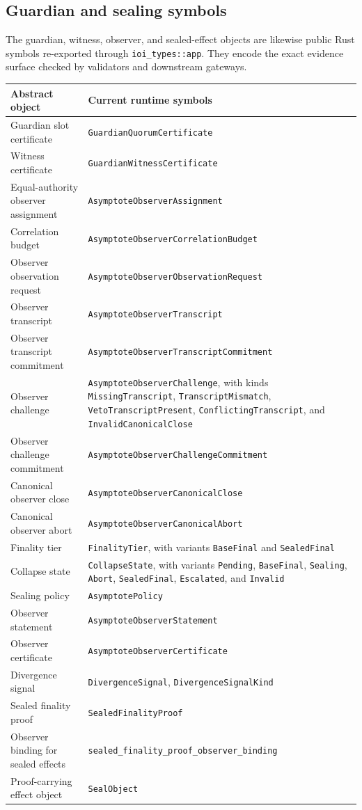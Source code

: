 \documentclass[11pt]{article}
\newcommand{\code}[1]{\texttt{#1}}
\begin{document}
\subsection{Guardian and sealing symbols}

The guardian, witness, observer, and sealed-effect objects are likewise public
Rust symbols re-exported through \code{ioi\_types::app}. They encode the exact
evidence surface checked by validators and downstream gateways.

\begin{center}
\small
\begin{tabularx}{\textwidth}{>{\raggedright\arraybackslash}p{} X}
\toprule
\textbf{Abstract object} & \textbf{Current runtime symbols} \\
\midrule
Guardian slot certificate & \code{GuardianQuorumCertificate} \\
Witness certificate & \code{GuardianWitnessCertificate} \\
Equal-authority observer assignment & \code{AsymptoteObserverAssignment} \\
Correlation budget & \code{AsymptoteObserverCorrelationBudget} \\
Observer observation request & \code{AsymptoteObserverObservationRequest} \\
Observer transcript & \code{AsymptoteObserverTranscript} \\
Observer transcript commitment & \code{AsymptoteObserverTranscriptCommitment} \\
Observer challenge & \code{AsymptoteObserverChallenge}, with kinds \code{MissingTranscript}, \code{TranscriptMismatch}, \code{VetoTranscriptPresent}, \code{ConflictingTranscript}, and \code{InvalidCanonicalClose} \\
Observer challenge commitment & \code{AsymptoteObserverChallengeCommitment} \\
Canonical observer close & \code{AsymptoteObserverCanonicalClose} \\
Canonical observer abort & \code{AsymptoteObserverCanonicalAbort} \\
Finality tier & \code{FinalityTier}, with variants \code{BaseFinal} and \code{SealedFinal} \\
Collapse state & \code{CollapseState}, with variants \code{Pending}, \code{BaseFinal}, \code{Sealing}, \code{Abort}, \code{SealedFinal}, \code{Escalated}, and \code{Invalid} \\
Sealing policy & \code{AsymptotePolicy} \\
Observer statement & \code{AsymptoteObserverStatement} \\
Observer certificate & \code{AsymptoteObserverCertificate} \\
Divergence signal & \code{DivergenceSignal}, \code{DivergenceSignalKind} \\
Sealed finality proof & \code{SealedFinalityProof} \\
Observer binding for sealed effects & \code{sealed\_finality\_proof\_observer\_binding} \\
Proof-carrying effect object & \code{SealObject} \\
\bottomrule
\end{tabularx}
\end{center}
\end{document}
